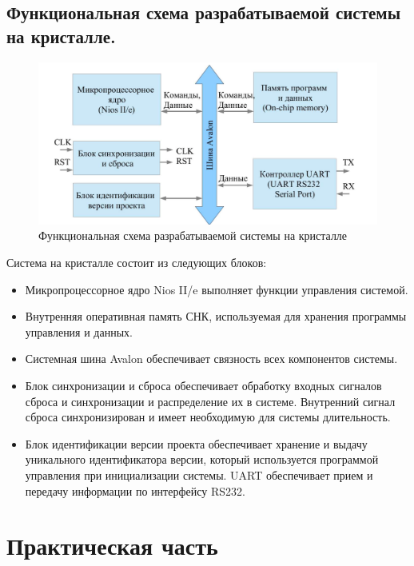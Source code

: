 \documentclass[12pt]{report}
\begin{document}
\section{Функциональная схема разрабатываемой системы на кристалле.}
\begin{figure}[hp!]
    \centering
    \includegraphics{report_files/Рисунок1.png}
    \caption{Функциональная схема разрабатываемой системы на кристалле}
    \label{fig:my_label}
\end{figure}
Система на кристалле состоит из следующих блоков:
\begin{itemize}
    \item Микропроцессорное ядро Nios II/e выполняет функции управления системой.
    \item Внутренняя оперативная память СНК, используемая для хранения программы управления и данных.
    \item Системная шина Avalon обеспечивает связность всех компонентов системы.
    \item Блок синхронизации и сброса обеспечивает обработку входных сигналов сброса и синхронизации и распределение их в системе. Внутренний сигнал сброса синхронизирован и имеет необходимую для системы длительность.
    \item Блок идентификации версии проекта обеспечивает хранение и выдачу уникального идентификатора версии, который используется программой управления при инициализации системы.
     UART обеспечивает прием и передачу информации по интерфейсу RS232.
\end{itemize}
\newpage

\chapter{Практическая часть}
\end{document}

